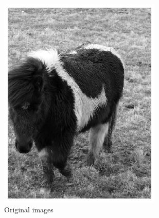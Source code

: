 \documentclass{l4proj}
\begin{document}
\begin{figure}[ht]
\begin{subfigure}[h!]{0.22\textwidth}
    \includegraphics[width=\textwidth, trim={0cm, 1cm, 0cm, 1cm}, clip]{images/autoencoder/pony_2/gray.png}
    \caption{Original images}
  \end{subfigure}
  \begin{subfigure}[h!]{0.22\textwidth}

\end{subfigure}
\end{figure}
\end{document}
